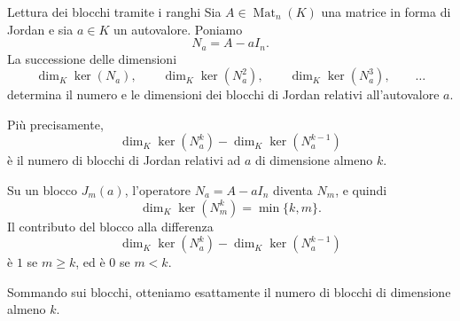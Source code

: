 \documentclass[a4paper]{article}
\begin{document}
\begin{radioactive}
\begin{snippetcorollary}{Lettura dei blocchi tramite i ranghi}
    Sia \(A\in\operatorname{Mat}_n(K)\) una matrice in forma di Jordan e sia \(a\in K\) un autovalore.
    Poniamo
    \[
        N_a=A-aI_n.
    \]
    La successione delle dimensioni
    \[
        \dim_K\ker(N_a),
        \qquad
        \dim_K\ker(N_a^2),
        \qquad
        \dim_K\ker(N_a^3),
        \qquad
        \ldots
    \]
    determina il numero e le dimensioni dei blocchi di Jordan relativi all'autovalore \(a\).

    Più precisamente,
    \[
        \dim_K\ker(N_a^k)-\dim_K\ker(N_a^{k-1})
    \]
    è il numero di blocchi di Jordan relativi ad \(a\) di dimensione almeno \(k\).
\end{snippetcorollary}
\end{radioactive}

\begin{radioactive}
\begin{snippetproof}{}
    Su un blocco \(J_m(a)\), l'operatore \(N_a=A-aI_n\) diventa \(N_m\), e quindi
    \[
        \dim_K\ker(N_m^k)=\min\{k,m\}.
    \]
    Il contributo del blocco alla differenza
    \[
        \dim_K\ker(N_a^k)-\dim_K\ker(N_a^{k-1})
    \]
    è \(1\) se \(m\geq k\), ed è \(0\) se \(m<k\).

    Sommando sui blocchi, otteniamo esattamente il numero di blocchi di dimensione almeno \(k\).
\end{snippetproof}
\end{radioactive}
\end{document}
